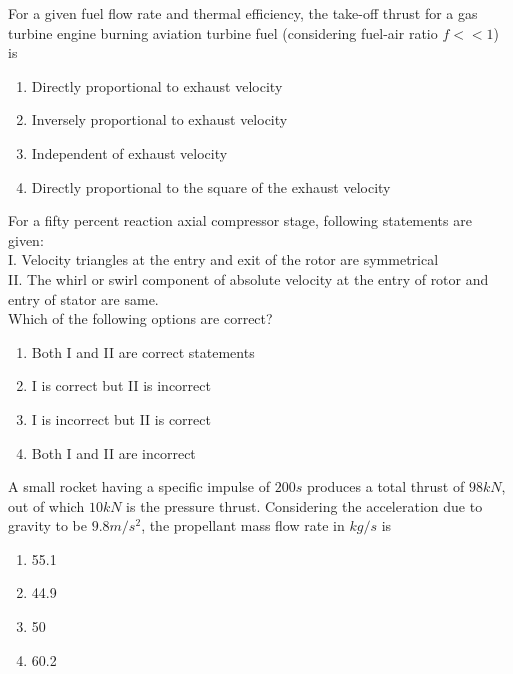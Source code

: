 \iffalse
\chapter{2014}
\author{AI24BTECH11009}
\section{ae}
\fi

\item For a given fuel flow rate and thermal efficiency, the take-off thrust for a gas turbine engine burning aviation turbine fuel (considering fuel-air ratio $f<<1$) is
    \begin{enumerate}
      \item Directly proportional to exhaust velocity 
      \item Inversely proportional to exhaust velocity
      \item Independent of exhaust velocity
      \item Directly proportional to the square of the exhaust velocity \\
    \end{enumerate}
\item For a fifty percent reaction axial compressor stage, following  statements are given: \\
I. Velocity triangles at the entry and exit of the rotor are symmetrical \\
II. The whirl or swirl component of absolute velocity at the entry of rotor and entry of stator are same. \\
Which of the following options are correct?
\begin{enumerate}
    \item Both I and II are correct statements 
    \item I is correct but II is incorrect
    \item I is incorrect but II is correct
    \item Both I and II are incorrect \\
\end{enumerate}
\item A small rocket having a specific impulse of $200s$ produces a total thrust of $98kN$, out of which $10kN$ is the pressure thrust. Considering the acceleration due to gravity to be $9.8m/s^2$, the propellant mass flow rate in $kg/s$ is
\begin{enumerate}
    \item 55.1 
    \item 44.9
    \item 50
    \item 60.2 \\
\end{enumerate}
